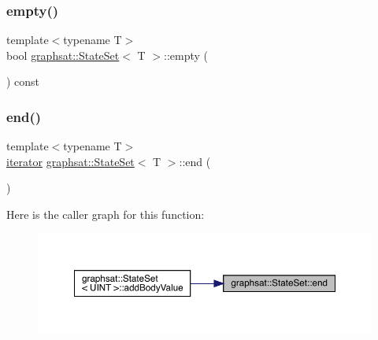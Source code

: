 \subsubsection{\texorpdfstring{empty()}{empty()}}
{\footnotesize\ttfamily template$<$typename T$>$ \\
bool \mbox{\hyperlink{classgraphsat_1_1_state_set}{graphsat\+::\+State\+Set}}$<$ T $>$\+::empty (\begin{DoxyParamCaption}{ }\end{DoxyParamCaption}) const\hspace{0.3cm}{\ttfamily [inline]}}

\mbox{\label{classgraphsat_1_1_state_set_acd8eccd91d95757b70c7d84207d888d8}} 
\subsubsection{\texorpdfstring{end()}{end()}\hspace{0.1cm}{\footnotesize\ttfamily [1/2]}}
{\footnotesize\ttfamily template$<$typename T$>$ \\
\mbox{\hyperlink{classgraphsat_1_1_state_set_1_1iterator}{iterator}} \mbox{\hyperlink{classgraphsat_1_1_state_set}{graphsat\+::\+State\+Set}}$<$ T $>$\+::end (\begin{DoxyParamCaption}{ }\end{DoxyParamCaption})\hspace{0.3cm}{\ttfamily [inline]}}

Here is the caller graph for this function\+:
\nopagebreak
\begin{figure}[H]
\begin{center}
\leavevmode
\includegraphics[width=350pt]{classgraphsat_1_1_state_set_acd8eccd91d95757b70c7d84207d888d8_icgraph}
\end{center}
\end{figure}
\mbox{\label{classgraphsat_1_1_state_set_af12eb07d08efb4b091302a2cf3b5e545}} 
